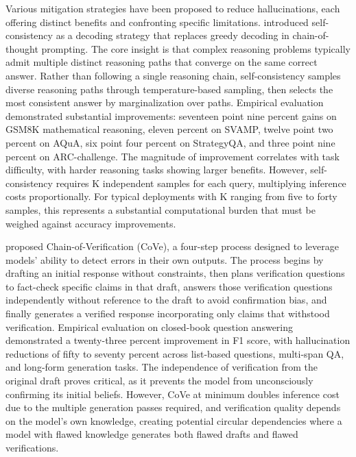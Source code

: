 Various mitigation strategies have been proposed to reduce hallucinations, each offering distinct benefits and confronting specific limitations. \citet{wang2023selfconsistency} introduced self-consistency as a decoding strategy that replaces greedy decoding in chain-of-thought prompting. The core insight is that complex reasoning problems typically admit multiple distinct reasoning paths that converge on the same correct answer. Rather than following a single reasoning chain, self-consistency samples diverse reasoning paths through temperature-based sampling, then selects the most consistent answer by marginalization over paths. Empirical evaluation demonstrated substantial improvements: seventeen point nine percent gains on GSM8K mathematical reasoning, eleven percent on SVAMP, twelve point two percent on AQuA, six point four percent on StrategyQA, and three point nine percent on ARC-challenge. The magnitude of improvement correlates with task difficulty, with harder reasoning tasks showing larger benefits. However, self-consistency requires K independent samples for each query, multiplying inference costs proportionally. For typical deployments with K ranging from five to forty samples, this represents a substantial computational burden that must be weighed against accuracy improvements.

\citet{dhuliawala2023chain} proposed Chain-of-Verification (CoVe), a four-step process designed to leverage models' ability to detect errors in their own outputs. The process begins by drafting an initial response without constraints, then plans verification questions to fact-check specific claims in that draft, answers those verification questions independently without reference to the draft to avoid confirmation bias, and finally generates a verified response incorporating only claims that withstood verification. Empirical evaluation on closed-book question answering demonstrated a twenty-three percent improvement in F1 score, with hallucination reductions of fifty to seventy percent across list-based questions, multi-span QA, and long-form generation tasks. The independence of verification from the original draft proves critical, as it prevents the model from unconsciously confirming its initial beliefs. However, CoVe at minimum doubles inference cost due to the multiple generation passes required, and verification quality depends on the model's own knowledge, creating potential circular dependencies where a model with flawed knowledge generates both flawed drafts and flawed verifications.

